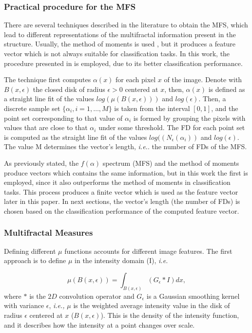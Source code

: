 \subsubsection{Practical procedure for the MFS}
There are several techniques described in the literature to obtain the MFS, which lead to different representations of the multifractal information present in the structure. Usually, the method of moments is used \cite{Mendoza2010,Serrano2012}, but it produces a feature vector which is not always suitable for classification tasks. In this work, the procedure presented in \cite{Xu2009} is employed, due to its better classification performance.

The technique first computes $\alpha(x)$ for each pixel $x$ of the image. Denote with $B(x,\epsilon)$ the closed disk of radius $\epsilon > 0$ centered at $x$, then, $\alpha(x)$ is defined as a straight line fit of the values $log(\mu(B(x,\epsilon)))$ and $log(\epsilon)$. Then, a discrete sample set $\{\alpha_{i}, i = 1,\dots,M\}$ is taken from the interval $[0,1]$, and the point set corresponding to that value of $\alpha_{i}$ is formed by grouping the pixels with values that are close to that $\alpha_{i}$ under some threshold. The FD for each point set is computed as the straight line fit of the values $log((N_{\epsilon}(\alpha_{i}))$ and $log(\epsilon)$. The value M determines the vector's length, {\em i.e.}. the number of FDs of the MFS.


As previously stated, the $f(\alpha)$ spectrum (MFS) and the method of moments produce vectors which contains the same information, but in this work the first is employed, since it also outperforms the method of moments in classification tasks. This process produces a finite vector which is used as the feature vector later in this paper.  In next sections, the vector's length (the number of FDs) is chosen based on the classification performance of the computed feature vector.


\subsubsection{Multifractal Measures}
Defining different $\mu$ functions accounts for different image features. The first approach is to define $\mu$ in the intensity domain (I), {\em i.e.}

\begin{equation}
\mu(B(x,\epsilon)) = \int_{B(x,\epsilon)}{(G_{\epsilon} \ast I)} dx,
\label{eqn:eqn11}
\end{equation}
where $\ast$ is the $2D$ convolution operator and $G_{\epsilon}$ is a Gaussian smoothing kernel with variance $\epsilon$, {\em i.e., } $\mu$ is the weighted average intensity value in the disk of radius $\epsilon$ centered at $x$ ($B(x,\epsilon)$). This is the density of the intensity function, and it describes how the intensity at a point changes over scale.


